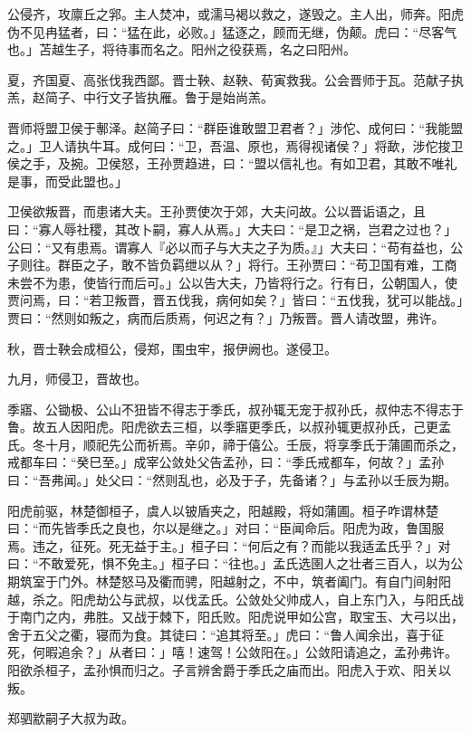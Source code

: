 \documentclass[]{article}
\begin{document}
公侵齐，攻廪丘之郛。主人焚冲，或濡马褐以救之，遂毁之。主人出，师奔。阳虎伪不见冉猛者，曰：``猛在此，必败。」猛逐之，顾而无继，伪颠。虎曰：``尽客气也。」苫越生子，将待事而名之。阳州之役获焉，名之曰阳州。

夏，齐国夏、高张伐我西鄙。晋士鞅、赵鞅、荀寅救我。公会晋师于瓦。范献子执羔，赵简子、中行文子皆执雁。鲁于是始尚羔。

晋师将盟卫侯于鄟泽。赵简子曰：``群臣谁敢盟卫君者？」涉佗、成何曰：``我能盟之。」卫人请执牛耳。成何曰：``卫，吾温、原也，焉得视诸侯？」将歃，涉佗捘卫侯之手，及捥。卫侯怒，王孙贾趋进，曰：``盟以信礼也。有如卫君，其敢不唯礼是事，而受此盟也。」

卫侯欲叛晋，而患诸大夫。王孙贾使次于郊，大夫问故。公以晋诟语之，且曰：``寡人辱社稷，其改卜嗣，寡人从焉。」大夫曰：``是卫之祸，岂君之过也？」公曰：``又有患焉。谓寡人『必以而子与大夫之子为质。』」大夫曰：``苟有益也，公子则往。群臣之子，敢不皆负羁绁以从？」将行。王孙贾曰：``苟卫国有难，工商未尝不为患，使皆行而后可。」公以告大夫，乃皆将行之。行有日，公朝国人，使贾问焉，曰：``若卫叛晋，晋五伐我，病何如矣？」皆曰：``五伐我，犹可以能战。」贾曰：``然则如叛之，病而后质焉，何迟之有？」乃叛晋。晋人请改盟，弗许。

秋，晋士鞅会成桓公，侵郑，围虫牢，报伊阙也。遂侵卫。

九月，师侵卫，晋故也。

季寤、公锄极、公山不狃皆不得志于季氏，叔孙辄无宠于叔孙氏，叔仲志不得志于鲁。故五人因阳虎。阳虎欲去三桓，以季寤更季氏，以叔孙辄更叔孙氏，己更孟氏。冬十月，顺祀先公而祈焉。辛卯，禘于僖公。壬辰，将享季氏于蒲圃而杀之，戒都车曰：``癸巳至。」成宰公敛处父告孟孙，曰：``季氏戒都车，何故？」孟孙曰：``吾弗闻。」处父曰：``然则乱也，必及于子，先备诸？」与孟孙以壬辰为期。

阳虎前驱，林楚御桓子，虞人以铍盾夹之，阳越殿，将如蒲圃。桓子咋谓林楚曰：``而先皆季氏之良也，尔以是继之。」对曰：``臣闻命后。阳虎为政，鲁国服焉。违之，征死。死无益于主。」桓子曰：``何后之有？而能以我适孟氏乎？」对曰：``不敢爱死，惧不免主。」桓子曰：``往也。」孟氏选圉人之壮者三百人，以为公期筑室于门外。林楚怒马及衢而骋，阳越射之，不中，筑者阖门。有自门间射阳越，杀之。阳虎劫公与武叔，以伐孟氏。公敛处父帅成人，自上东门入，与阳氏战于南门之内，弗胜。又战于棘下，阳氏败。阳虎说甲如公宫，取宝玉、大弓以出，舍于五父之衢，寝而为食。其徒曰：``追其将至。」虎曰：``鲁人闻余出，喜于征死，何暇追余？」从者曰：」嘻！速驾！公敛阳在。」公敛阳请追之，孟孙弗许。阳欲杀桓子，孟孙惧而归之。子言辨舍爵于季氏之庙而出。阳虎入于欢、阳关以叛。

郑驷歂嗣子大叔为政。
\end{document}
